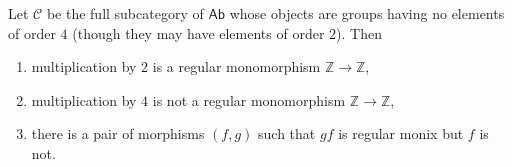 Let $\mathcal{C}$ be the full subcategory of $\mathsf{Ab}$ whose objects
are groups having no elements of order $4$ (though they may have elements of
order $2$). Then
\begin{enumerate}[label=(\roman*)]
	\item multiplication by $2$ is a regular monomorphism $\mathbb{Z}\to \mathbb{Z}$,
	\item multiplication by $4$ is not a regular monomorphism $\mathbb{Z}\to \mathbb{Z}$,
	\item there is a pair of morphisms $(f, g)$ such that $gf$ is regular monix but $f$
		is not.
\end{enumerate}
